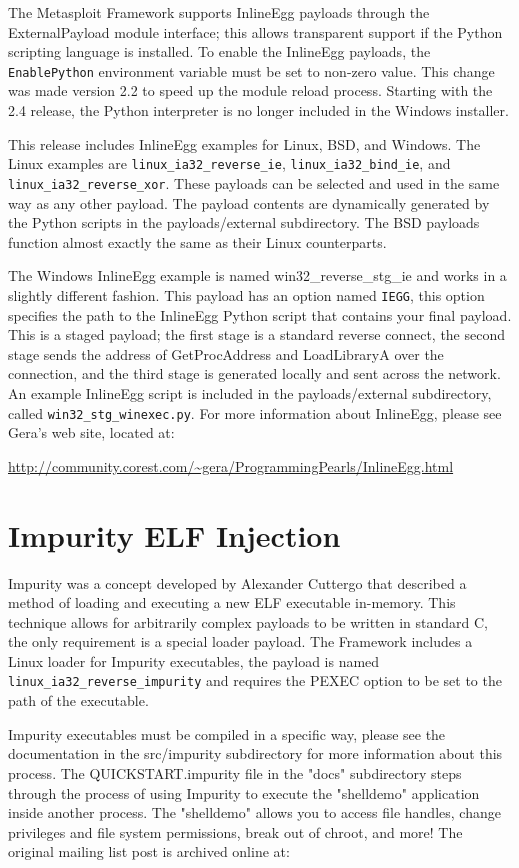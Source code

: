\documentclass{report}
\begin{document}
\par
The Metasploit Framework supports InlineEgg payloads through the ExternalPayload
module interface; this allows transparent support if the Python scripting
language is installed. To enable the InlineEgg payloads, the
\texttt{EnablePython} environment variable must be set to non-zero value. This
change was made version 2.2 to speed up the module reload process. Starting with
the 2.4 release, the Python interpreter is no longer included in the Windows
installer.

\par
This release includes InlineEgg examples for Linux, BSD, and Windows. The Linux
examples are \texttt{linux\_ia32\_reverse\_ie}, \texttt{linux\_ia32\_bind\_ie}, and
\texttt{linux\_ia32\_reverse\_xor}. These payloads can be selected and used in the same
way as any other payload. The payload contents are dynamically generated by the
Python scripts in the payloads/external subdirectory. The BSD payloads function
almost exactly the same as their Linux counterparts. 

\par
The Windows InlineEgg example is named win32\_reverse\_stg\_ie and works in a
slightly different fashion. This payload has an option named \texttt{IEGG}, this option
specifies the path to the InlineEgg Python script that contains your final
payload. This is a staged payload; the first stage is a standard reverse
connect, the second stage sends the address of GetProcAddress and LoadLibraryA
over the connection, and the third stage is generated locally and sent across
the network. An example InlineEgg script is included in the payloads/external
subdirectory, called \texttt{win32\_stg\_winexec.py}. For more information about
InlineEgg, please see Gera's web site, located at: 

\url{http://community.corest.com/~gera/ProgrammingPearls/InlineEgg.html}


\section{Impurity ELF Injection}
\par
Impurity was a concept developed by Alexander Cuttergo that described a method
of loading and executing a new ELF executable in-memory. This technique allows
for arbitrarily complex payloads to be written in standard C, the only
requirement is a special loader payload. The Framework includes a Linux loader
for Impurity executables, the payload is named
\texttt{linux\_ia32\_reverse\_impurity} and requires the PEXEC option to be set
to the path of the executable. 
\par
Impurity executables must be compiled in a
specific way, please see the documentation in the src/impurity subdirectory
for more information about this process. The QUICKSTART.impurity file in the
"docs" subdirectory steps through the process of using Impurity to execute the
"shelldemo" application inside another process. The "shelldemo" allows you to
access file handles, change privileges and file system permissions, break out of
chroot, and more! The original mailing list post is archived online at:
\end{document}
